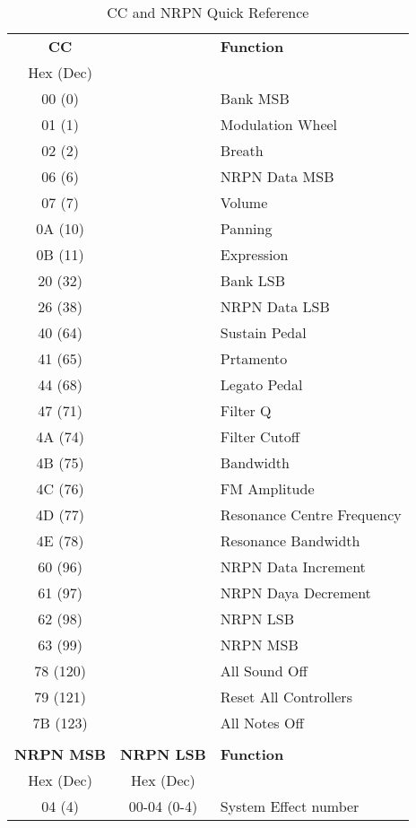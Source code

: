       \begin{table}[H]
      \centering
      \caption{CC and NRPN Quick Reference}
      \label{table:CCandNRPNreference}
      \begin{tabular}{c c l}
    \textbf{CC} & & \textbf{Function} \\
       Hex (Dec) \\
       00 (0) & & Bank MSB\\
       01 (1) & & Modulation Wheel\\
       02 (2) & & Breath\\
       06 (6) & & NRPN Data MSB\\
       07 (7) & & Volume\\
       0A (10) & & Panning\\
       0B (11) & & Expression\\
       20 (32) & & Bank LSB\\
       26 (38) & & NRPN Data LSB \\
       40 (64) & & Sustain Pedal \\
       41 (65) & & Prtamento \\
       44 (68) & & Legato Pedal \\
       47 (71) & & Filter Q \\
       4A (74) & & Filter Cutoff \\
       4B (75) & & Bandwidth \\
       4C (76) & & FM Amplitude \\
       4D (77) & & Resonance Centre Frequency\\
       4E (78) & & Resonance Bandwidth \\
       60 (96) & & NRPN Data Increment \\
       61 (97) & & NRPN Daya Decrement \\
       62 (98) & & NRPN LSB \\
       63 (99) & & NRPN MSB \\
       78 (120) & & All Sound Off \\
       79 (121) & & Reset All Controllers \\
       7B (123) & & All Notes Off\\
       \\
    \textbf{NRPN MSB} & \textbf{NRPN LSB} & \textbf{Function} \\
        Hex (Dec) & Hex (Dec)\\
        04 (4) & 00-04 (0-4)& System Effect number \\

\end{tabular}
\end{table}
